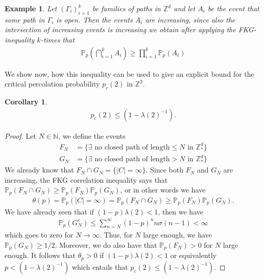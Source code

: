 \documentclass[12pt,a4paper]{article}
\newtheorem{cor}{Corollary}[section]
\newtheorem{exmp}{Example}[section]
\theoremstyle{definition}
\begin{document}
\begin{exmp}
Let $(\Gamma_i)_{i=1}^k$ be families of paths in $\mathbb{Z}^d$ and let $A_i$ be the event that some path in $\Gamma_i$ is open. Then the events $A_i$ are increasing, since also the intersection of increasing events is increasing we obtain after applying the FKG-inequality $k$-times that 
\begin{align*}
\mathbb{P}_p \left( \bigcap_{i=1}^k A_i \right) \geq \prod_{i=1}^k \mathbb{P}_p(A_i)
\end{align*}
\end{exmp}
We show now, how this inequality can be used to give an explicit bound for the critical percolation probability $p_c(2)$ in $\mathbb{Z}^2$. 
\newpage
\begin{cor} \begin{align*}
p_c(2) \leq (1- \lambda(2)^{-1}). 
\end{align*}
\end{cor}
\begin{proof}
Let $N \in \mathbb{N}$, we define the events
\begin{align*}
F_N &= \{ \exists \text{ no closed path of length} \leq N \text{ in } \mathbb{Z}_*^d \} 
\\
G_N & = \{ \exists \text{ no closed path of length} > N \text{ in } \mathbb{Z}_*^d \} 
\end{align*}
We already know that $F_N \cap G_N = \{|C| = \infty \}$. Since both $F_N$ and $G_N$ are increasing, the FKG correlation inequality says that $\mathbb{P}_p( F_N \cap G_N) \geq \mathbb{P}_p(F_N) \mathbb{P}_p(G_N)$, or in other words we have 
\begin{align*}
\theta(p) = \mathbb{P}_p(|C| = \infty ) = \mathbb{P}_p( F_N \cap G_N) \geq \mathbb{P}_p(F_N) \mathbb{P}_p(G_N).
\end{align*}
We have already seen that if $(1-p) \lambda(2) < 1$, then we have
\begin{align*}
\mathbb{P}_p(G_N^c) \leq \sum_{n=N}^\infty (1-p)^n n \sigma(n-1) < \infty
\end{align*}
which goes to zero for $N \to \infty$. Thus, for $N$ large enough, we have $\mathbb{P}_p(G_N) \geq 1/2$. Moreover, we do also have that $\mathbb{P}_p(F_N)>0$ for $N$ large enough. It follows that $\theta_p >0$ if $(1-p) \lambda(2) <1$ or equivalently $p < (1- \lambda(2)^{-1})$ which entails that $p_c(2) \leq (1- \lambda(2)^{-1})$. 
\end{proof}
\newpage
\end{document}
